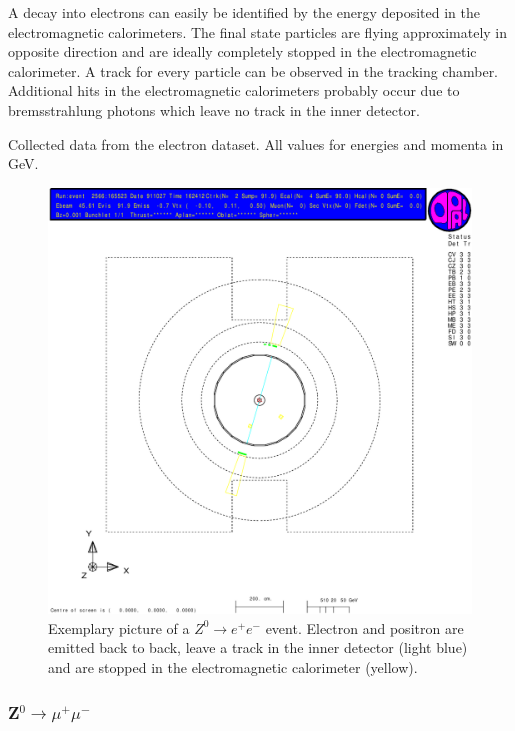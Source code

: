 \documentclass[11pt, a4paper]{article}
\numberwithin{equation}{section}
\begin{document}
A decay into electrons can easily be identified by the energy deposited in the electromagnetic calorimeters.
The final state particles are flying approximately in opposite direction and are ideally completely stopped in the electromagnetic calorimeter.
A track for every particle can be observed in the tracking chamber.
Additional hits in the electromagnetic calorimeters probably occur due to bremsstrahlung photons which leave no track in the inner detector.
\begin{table}
	\centering
	
	\caption{Collected data from the electron dataset. All values for energies and momenta in \si{GeV}.}
\end{table}
\begin{figure}[h]
	\centering
	\includegraphics[width=\textwidth]{./data/tag1/ee_pics/cropped/ee_02}
	\caption{Exemplary picture of a $Z^0\rightarrow e^+e^-$ event. Electron and positron are emitted back to back, leave a track in the inner detector (light blue) and are stopped in the electromagnetic calorimeter (yellow).}
\end{figure}
\clearpage
\subsubsection{Z$^0\rightarrow \mu^+\mu^-$}
\end{document}
